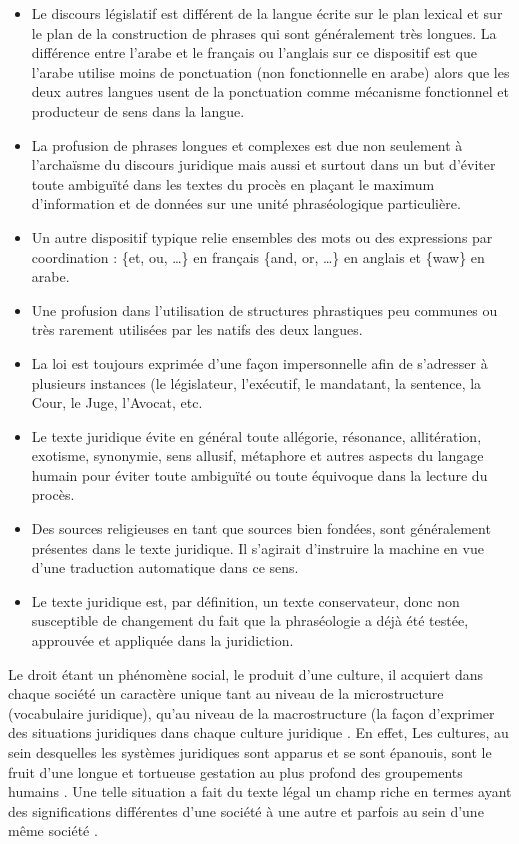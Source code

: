\documentclass[french]{textolivre}
\begin{document}
\begin{itemize}
    \item Le discours législatif est différent de la langue écrite sur le plan lexical et sur le plan de la construction de phrases qui sont généralement très longues. La différence entre l’arabe et le français ou l’anglais sur ce dispositif est que l’arabe utilise moins de ponctuation (non fonctionnelle en arabe) alors que les deux autres langues usent de la ponctuation comme mécanisme fonctionnel et producteur de sens dans la langue.
    \item La profusion de phrases longues et complexes est due non seulement à l’archaïsme du discours juridique mais aussi et surtout dans un but d’éviter toute ambiguïté dans les textes du procès en plaçant le maximum d’information et de données sur une unité phraséologique particulière.
    \item Un autre dispositif typique relie ensembles des mots ou des expressions par coordination : \{et, ou, …\} en français \{and, or, …\} en anglais et \{waw\} en arabe.
    \item Une profusion dans l’utilisation de structures phrastiques peu communes ou très rarement utilisées par les natifs des deux langues.
    \item La loi est toujours exprimée d'une façon impersonnelle afin de s'adresser à plusieurs instances (le législateur, l’exécutif, le mandatant, la sentence, la Cour, le Juge, l’Avocat, etc.
    \item Le texte juridique évite en général toute allégorie, résonance, allitération, exotisme, synonymie, sens allusif, métaphore et autres aspects du langage humain pour éviter toute ambiguïté ou toute équivoque dans la lecture du procès.
    \item Des sources religieuses en tant que sources bien fondées, sont généralement présentes dans le texte juridique. Il s’agirait d’instruire la machine en vue d’une traduction automatique dans ce sens.
    \item Le texte juridique est, par définition, un texte conservateur, donc non susceptible de changement du fait que la phraséologie a déjà été testée, approuvée et appliquée dans la juridiction.
\end{itemize}

Le droit étant un phénomène social, le produit d’une culture, il acquiert dans chaque société un caractère unique tant au niveau de la microstructure (vocabulaire juridique), qu’au niveau de la macrostructure (la façon d’exprimer des situations juridiques dans chaque culture juridique \cite[p. 179]{petru2016}. En effet, Les cultures, au sein desquelles les systèmes juridiques sont apparus et se sont épanouis, sont le fruit d'une longue et tortueuse gestation au plus profond des groupements humains \cite[p. 17]{gemar2019}. Une telle situation a fait du texte légal un champ riche en termes ayant des significations différentes d’une société à une autre et parfois au sein d’une même société \cite[p. 20]{gemar2019}.
\end{document}
